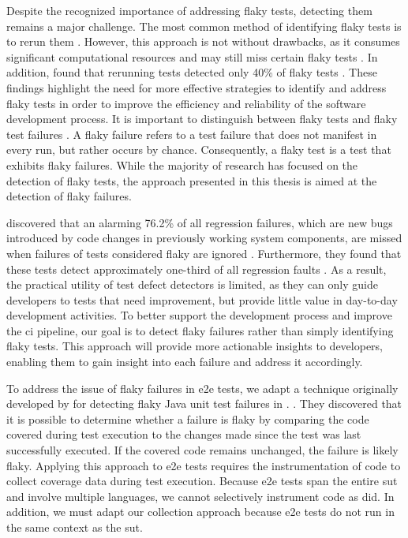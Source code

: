 Despite the recognized importance of addressing flaky tests, detecting them remains a major challenge.
The most common method of identifying flaky tests is to rerun them \autocite{lam_idflakies_2019, lam_understanding_2020}.
However, this approach is not without drawbacks, as it consumes significant computational resources and may still miss certain flaky tests \autocite{bell_deflaker_2018, luo_empirical_2014}.
In addition, \citeauthor*{parry_what_2022} found that rerunning tests detected only 40\% of flaky tests \autocite{parry_what_2022}.
These findings highlight the need for more effective strategies to identify and address flaky tests in order to improve the efficiency and reliability of the software development process.
It is important to distinguish between flaky tests and flaky test failures \autocite{haben_importance_2023}.
A flaky failure refers to a test failure that does not manifest in every run, but rather occurs by chance.
Consequently, a flaky test is a test that exhibits flaky failures.
While the majority of research has focused on the detection of flaky tests, the approach presented in this thesis is aimed at the detection of flaky failures.

 discovered that an alarming 76.2\% of all regression failures, which are new bugs introduced by code changes in previously working system components, are missed when failures of tests considered flaky are ignored \autocite{haben_importance_2023}.
Furthermore, they found that these tests detect approximately one-third of all regression faults \autocite{haben_importance_2023}.
As a result, the practical utility of test defect detectors is limited, as they can only guide developers to tests that need improvement, but provide little value in day-to-day development activities.
To better support the development process and improve the \ac{ci} pipeline, our goal is to detect flaky failures rather than simply identifying flaky tests.
This approach will provide more actionable insights to developers, enabling them to gain insight into each failure and address it accordingly.

To address the issue of flaky failures in \ac{e2e} tests, we adapt a technique originally developed by \citeauthor*{bell_deflaker_2018} for detecting flaky Java unit test failures in . \autocite{bell_deflaker_2018}.
They discovered that it is possible to determine whether a failure is flaky by comparing the code covered during test execution to the changes made since the test was last successfully executed.
If the covered code remains unchanged, the failure is likely flaky.
Applying this approach to \ac{e2e} tests requires the instrumentation of code to collect coverage data during test execution.
Because \ac{e2e} tests span the entire \ac{sut} and involve multiple languages, we cannot selectively instrument code as \citeauthor*{bell_deflaker_2018} did.
In addition, we must adapt our collection approach because \ac{e2e} tests do not run in the same context as the \ac{sut}.

